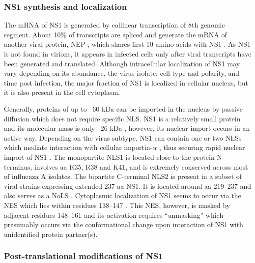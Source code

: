 		\subsubsection{NS1 synthesis and localization}
		
		The mRNA of \gls{NS1} is generated by collinear transcription of 8th genomic segment. About 10\% of transcripts are spliced and generate the mRNA of another viral protein, \gls{NEP} \parencite{Lamb1980}, which shares first 10 amino acids with \gls{NS1} \parencite{Inglis1979, Lamb1979, Lamb1980}. As \gls{NS1} is not found in virions, it appears in infected cells only after viral transcripts have been generated and translated. Although intracellular localization of \gls{NS1} may vary depending on its abundance, the virus isolate, cell type and polarity, and time post infection, the major fraction of \gls{NS1} is localized in cellular nucleus, but it is also present in the cell cytoplasm\parencite{Melen2007, Melen2012, Newby2007, Li1998, Greenspan1988}. 
		
		Generally, proteins of up to ~60 kDa can be imported in the nucleus by passive diffusion \parencite{Macara2001, Wang2007} which does not require specific \gls{NLS}. \gls{NS1} is a relatively small protein and its molecular mass is only ~26 kDa \parencite{Ward1994}, however, its nuclear import occurs in an active way. Depending on the virus subtype, \gls{NS1} can contain one or two \gls{NLS}s which mediate interaction with cellular importin-$\alpha$ \parencite{Melen2007}, thus securing rapid nuclear import of \gls{NS1} \parencite{Privalsky1981}. The monopartite \gls{NLS}1 is located close to the protein N-terminus, involves aa R35, R38 and K41, and is extremely conserved across most of influenza A isolates. The bipartite C-terminal NLS2 is present in a subset of viral strains expressing extended 237 aa \gls{NS1}. It is located around aa 219--237 and also serves as a \gls{NoLS} \parencite{Melen2007, Melen2012}. Cytoplasmic localization of \gls{NS1} seems to occur via the \gls{NES} which lies within residues 138--147 \parencite{Li1998}. This \gls{NES}, however, is masked by adjacent residues 148--161 and its activation requires ``unmasking'' which presumably occurs via the conformational change upon interaction of \gls{NS1} with unidentified protein partner(s). 
		
		\subsubsection{Post-translational modifications of NS1}
		
